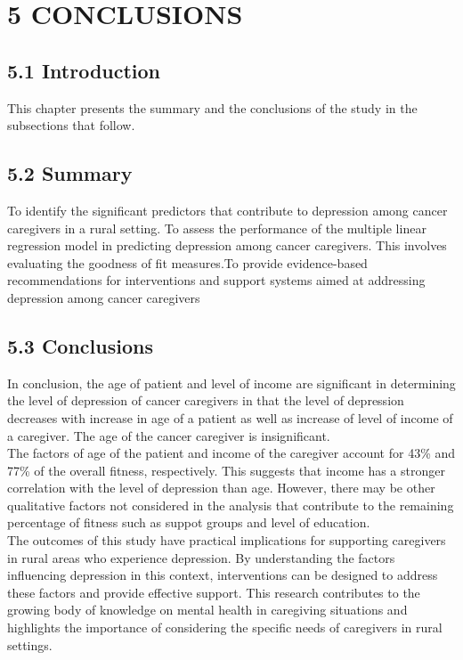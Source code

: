 \documentclass[12pt]{article}
\begin{document}
	\section*{5 CONCLUSIONS}
	\subsection*{5.1 Introduction}
	This chapter presents the summary and the conclusions of the study in the subsections that follow.
	\subsection*{5.2 Summary}
	To identify the significant predictors that contribute to depression among cancer
	caregivers in a rural setting. To assess the performance of the multiple linear regression model in predicting depression among cancer caregivers. This involves evaluating the goodness of fit measures.To provide evidence-based recommendations for interventions and support systems
	aimed at addressing depression among cancer caregivers
	\subsection*{5.3 Conclusions}
	In conclusion, the age of patient and level of income are significant in determining the level of depression of cancer caregivers in that the level of depression decreases with increase in age of a patient as well as increase of level of income of a caregiver. The age of the cancer caregiver is insignificant.\\
	
	\noindent The factors of age of the patient and income of the caregiver account for 43\% and 77\% of the overall fitness, respectively. This suggests that income has a stronger correlation with the  level of depression than age. However, there may be other qualitative factors not considered in the analysis that contribute to the remaining percentage of fitness such as suppot groups and level of education.\\
	
	\noindent The outcomes of this study have practical implications for supporting caregivers in rural areas who experience depression. By understanding the factors influencing depression in this context, interventions can be designed to address these factors and provide effective support. This research contributes to the growing body of knowledge on mental health in caregiving situations and highlights the importance of considering the specific needs of caregivers in rural settings.\\
	
\end{document}
